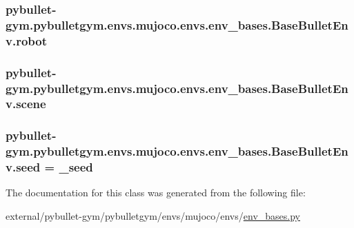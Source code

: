 \subsubsection[{\texorpdfstring{robot}{robot}}]{\setlength{\rightskip}{0pt plus 5cm}pybullet-\/gym.\+pybulletgym.\+envs.\+mujoco.\+envs.\+env\+\_\+bases.\+Base\+Bullet\+Env.\+robot}\hypertarget{classpybullet-gym_1_1pybulletgym_1_1envs_1_1mujoco_1_1envs_1_1env__bases_1_1_base_bullet_env_a3d69bd15ce3e96be0b75c2500cf49775}{}\label{classpybullet-gym_1_1pybulletgym_1_1envs_1_1mujoco_1_1envs_1_1env__bases_1_1_base_bullet_env_a3d69bd15ce3e96be0b75c2500cf49775}
\subsubsection[{\texorpdfstring{scene}{scene}}]{\setlength{\rightskip}{0pt plus 5cm}pybullet-\/gym.\+pybulletgym.\+envs.\+mujoco.\+envs.\+env\+\_\+bases.\+Base\+Bullet\+Env.\+scene}\hypertarget{classpybullet-gym_1_1pybulletgym_1_1envs_1_1mujoco_1_1envs_1_1env__bases_1_1_base_bullet_env_af98ff6702b785e65ac2b78d27ee2d748}{}\label{classpybullet-gym_1_1pybulletgym_1_1envs_1_1mujoco_1_1envs_1_1env__bases_1_1_base_bullet_env_af98ff6702b785e65ac2b78d27ee2d748}
\subsubsection[{\texorpdfstring{seed}{seed}}]{\setlength{\rightskip}{0pt plus 5cm}pybullet-\/gym.\+pybulletgym.\+envs.\+mujoco.\+envs.\+env\+\_\+bases.\+Base\+Bullet\+Env.\+seed = \+\_\+seed\hspace{0.3cm}{\ttfamily [static]}}\hypertarget{classpybullet-gym_1_1pybulletgym_1_1envs_1_1mujoco_1_1envs_1_1env__bases_1_1_base_bullet_env_a01f3ab5479b65ce8f420b0625fed0781}{}\label{classpybullet-gym_1_1pybulletgym_1_1envs_1_1mujoco_1_1envs_1_1env__bases_1_1_base_bullet_env_a01f3ab5479b65ce8f420b0625fed0781}


The documentation for this class was generated from the following file\+:\begin{DoxyCompactItemize}
\item 
external/pybullet-\/gym/pybulletgym/envs/mujoco/envs/\hyperlink{mujoco_2envs_2env__bases_8py}{env\+\_\+bases.\+py}\end{DoxyCompactItemize}
